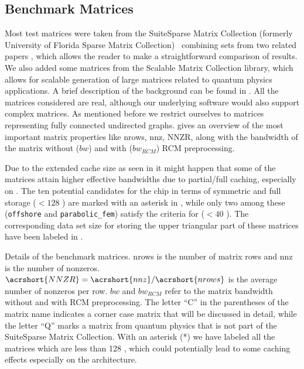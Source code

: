 \subsection{Benchmark Matrices}
\label{subsec:bench_mat}
Most test matrices were taken from the Suite\-Sparse Matrix Collection (formerly University of Florida Sparse Matrix Collection)~\cite{UOF} combining sets from two related papers \cite{RSB,park_ls}, which allows the reader to make a straightforward comparison of results.  We also added some matrices from the Scalable Matrix Collection library\cite{ScaMaC}, which allows for scalable generation of large matrices related to quantum physics applications. A brief description of the background can be found in \cite{ScaMaC}. All the matrices considered are real, although our underlying software would also support complex matrices.
As mentioned before we restrict ourselves to matrices representing fully connected undirected graphs.
 gives an overview of the most important matrix properties like \acrfull{nrows}, \acrfull{nnz}, \acrfull{NNZR}, along with the bandwidth of the matrix without ($bw$) and with ($bw_{RCM}$) \acrshort{RCM} preprocessing. 

Due to the extended cache size as seen in  it
might happen that some of the matrices attain higher effective
bandwidths due to partial/full caching, especially on \SKX. The ten potential candidates
for the \SKX chip in terms of symmetric and full storage ($< 128$ \MB)
are marked with an asterisk in , while only
two among these (\texttt{offshore} and \texttt{parabolic\_fem}) 
satisfy the criteria for \IVB ($< 40$ \MB). The corresponding data set
size for storing the upper triangular part of these matrices have been
labeled in .

\begin{table}[t]
	\centering
	\caption{Details of the benchmark matrices. \acrshort{nrows} is the number of matrix rows and \acrshort{nnz} is the number of nonzeros. $\acrshort{NNZR}=\acrshort{nnz}/\acrshort{nrows}$ is the average number of nonzeros per row. $bw$ and $bw_{RCM}$ refer to the matrix bandwidth without and with \acrshort{RCM} preprocessing. The letter ``C'' in the parentheses of the matrix name indicates a corner case matrix that will be discussed in detail, while the letter ``Q'' marks a matrix from quantum physics that is not part of the SuiteSparse Matrix Collection. With an asterisk (*) we have labeled all the matrices which are less than 128 \MB, which could potentially lead to some caching effects especially on the \SKX architecture. \label{tab:test_mtx}	\label{table:bench_matrices}}
	\begin{center}
		
	\end{center}
\end{table}

